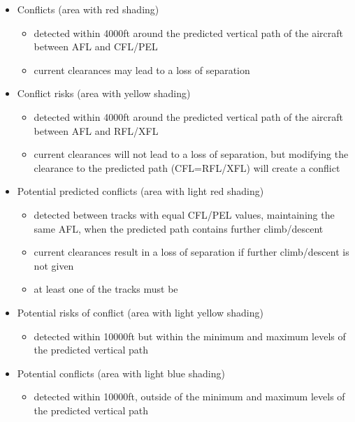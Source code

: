 \documentclass[a4paper,oneside,11pt]{memoir}
\begin{document}
\begin{itemize}
    \item Conflicts (area with red shading)
    \begin{itemize}
        \item detected within 4000ft around the predicted vertical path of the aircraft between AFL and CFL/PEL
        \item current clearances may lead to a loss of separation
    \end{itemize}
    \item Conflict risks (area with yellow shading)
    \begin{itemize}
        \item detected within 4000ft around the predicted vertical path of the aircraft between AFL and RFL/XFL
        \item current clearances will not lead to a loss of separation, but modifying the clearance to the predicted path (CFL=RFL/XFL) will create a conflict
    \end{itemize}
    \item Potential predicted conflicts (area with light red shading)
    \begin{itemize}
        \item detected between tracks with equal CFL/PEL values, maintaining the same AFL, when the predicted path contains further climb/descent
        \item current clearances result in a loss of separation if further climb/descent is not given
        \item at least one of the tracks must be 
    \end{itemize}
    \item Potential risks of conflict (area with light yellow shading)
    \begin{itemize}
        \item detected within 10000ft but within the minimum and maximum levels of the predicted vertical path
    \end{itemize}
    \item Potential conflicts (area with light blue shading)
    \begin{itemize}
        \item detected within 10000ft, outside of the minimum and maximum levels of the predicted vertical path
    \end{itemize}
\end{itemize}

\bigskip
\end{document}
